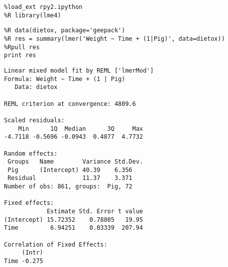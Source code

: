 \documentclass[12pt,fleqn]{article}\usepackage{../common}
\begin{document}
\begin{verbatim}
%load_ext rpy2.ipython
%R library(lme4)
\end{verbatim}

\begin{verbatim}
%R data(dietox, package='geepack')
%R res = summary(lmer('Weight ~ Time + (1|Pig)', data=dietox))
%Rpull res
print res
\end{verbatim}

\begin{verbatim}
Linear mixed model fit by REML ['lmerMod']
Formula: Weight ~ Time + (1 | Pig)
   Data: dietox

REML criterion at convergence: 4809.6

Scaled residuals: 
    Min      1Q  Median      3Q     Max 
-4.7118 -0.5696 -0.0943  0.4877  4.7732 

Random effects:
 Groups   Name        Variance Std.Dev.
 Pig      (Intercept) 40.39    6.356   
 Residual             11.37    3.371   
Number of obs: 861, groups:  Pig, 72

Fixed effects:
            Estimate Std. Error t value
(Intercept) 15.72352    0.78805   19.95
Time         6.94251    0.03339  207.94

Correlation of Fixed Effects:
     (Intr)
Time -0.275

\end{verbatim}
\end{document}
